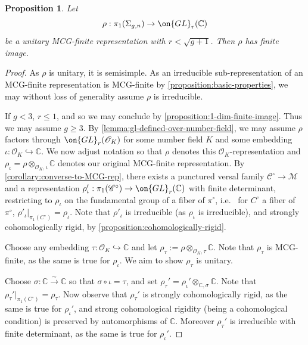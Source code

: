 \documentclass[12 pt]{amsart}
\theoremstyle{plain}
\newtheorem{proposition}[subsubsection]{Proposition}
\theoremstyle{definition}
\theoremstyle{remark}
\numberwithin{equation}{section}
\begin{document}
\begin{proposition}\label{proposition:unitary-implies-finite}
Let  $$\rho:\pi_1(\Sigma_{g,n})\to
\on{GL}_r(\mathbb{C})$$ be a unitary MCG-finite representation with $r<\sqrt{g+1}$. Then $\rho$ has finite image.
\end{proposition}
\begin{proof}
As $\rho$ is unitary, it is semisimple. As an irreducible sub-representation of an MCG-finite representation is MCG-finite by \autoref{proposition:basic-properties}, we may without loss of generality assume $\rho$ is irreducible.

If $g< 3$, $r\leq 1$, and so we may conclude by \autoref{proposition:1-dim-finite-image}. Thus we may assume $g\geq 3$. By \autoref{lemma:gl-defined-over-number-field}, we may assume $\rho$ factors through $\on{GL}_r(\mathscr{O}_K)$ for some number field $K$ and some embedding $\iota: \mathscr{O}_K\hookrightarrow \mathbb{C}$.
We now adjust notation so that $\rho$ denotes this $\mathscr O_K$-representation and $\rho_\iota=\rho\otimes_{\mathscr{O}_K, \iota}\mathbb{C}$
denotes our original MCG-finite representation. By \autoref{corollary:converse-to-MCG-rep}, there exists a punctured versal family $\mathscr C^\circ \to \mathscr M$
and a representation $\rho'_\iota: \pi_1(\mathscr C^\circ) \to
\on{GL}_r(\mathbb{C})$ with finite determinant, restricting to $\rho_\iota$ on
the fundamental group of a fiber of $\pi^\circ$, i.e.~ for $C^\circ$ a fiber of
$\pi^\circ$, $\rho'_\iota|_{\pi_1(
C^\circ)}=\rho_\iota$. Note that $\rho'_\iota$ is irreducible (as $\rho_\iota$
is irreducible), and strongly cohomologically rigid, by \autoref{proposition:cohomologically-rigid}.

Choose any embedding $\tau: \mathscr O_K \hookrightarrow \mathbb C$ and let
$\rho_\tau := \rho\otimes_{\mathscr{O}_K, \tau}\mathbb{C}$. Note that $\rho_\tau$ is MCG-finite, as the same is true for $\rho_\iota$. 
We aim to show $\rho_\tau$ is unitary.

Choose $\sigma: \mathbb{C}\overset{\sim}{\to} \mathbb{C}$ so that $\sigma\circ\iota=\tau$, and set $\rho_\tau'=\rho_{\iota}'\otimes_{\mathbb{C}, \sigma} \mathbb{C}$. Note that $\rho_\tau'|_{\pi_1(
C^\circ)}=\rho_\tau$.
Now observe that $\rho_\tau'$ is strongly cohomologically rigid, as the same is true for $\rho_\iota'$, and strong cohomological rigidity (being a cohomological condition) is preserved by automorphisms of $\mathbb{C}$. Moreover $\rho_\tau'$ is irreducible with finite determinant, as the same is true for $\rho_\iota'$.


\end{proof}
\end{document}
